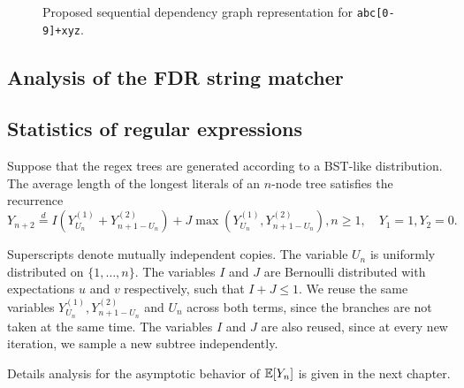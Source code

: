 \begin{figure}[htbp]
  \centering
  \caption{Proposed sequential dependency graph representation for \texttt{abc[0-9]+xyz}.}
  \label{fig:new_representation}
\end{figure}

\subsection{Analysis of the FDR string matcher}

\subsection{Statistics of regular expressions}

Suppose that the regex trees are generated according to a BST-like distribution. The average length of the longest literals of an $n$-node tree satisfies the recurrence
\begin{equation}
  \label{eq:longest-literal-recurrence}
  Y_{n+2} \stackrel{d}{=} I\left(Y_{U_n}^{(1)} + Y_{n+1-U_n}^{(2)}\right) + J\max\left(Y_{U_n}^{(1)}, Y_{n+1-U_n}^{(2)}\right), n\ge 1, \quad Y_1=1, Y_2=0.
\end{equation}

Superscripts denote mutually independent copies. The variable $U_n$ is uniformly distributed on $\{1, \ldots, n\}$. The variables $I$ and $J$ are Bernoulli distributed with expectations $u$ and $v$ respectively, such that $I + J \le 1$. We reuse the same variables $Y_{U_n}^{(1)}, Y_{n+1-U_n}^{(2)}$ and $U_n$ across both terms, since the branches are not taken at the same time. The variables $I$ and $J$ are also reused, since at every new iteration, we sample a new subtree independently.

Details analysis for the asymptotic behavior of $\mathbb{E}[Y_n]$ is given in the next chapter.